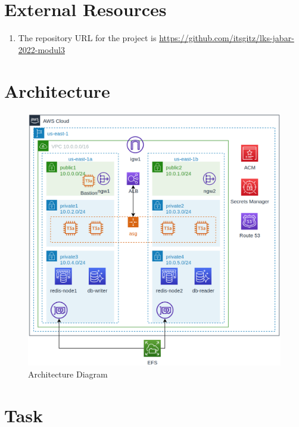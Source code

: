 \documentclass{article}
\begin{document}
\section{External Resources}\label{resources}
\begin{enumerate}
    \item The repository URL for the project is \href{https://github.com/itsgitz/lks-jabar-2022-modul3}{https://github.com/itsgitz/lks-jabar-2022-modul3}
\end{enumerate}

\newpage

\section{Architecture}
\begin{figure}[h]
\centering
\includegraphics[width=\textwidth]{modul3_architecture.png}
\caption{\label{fig:architecture}Architecture Diagram}
\end{figure}

\section{Task}
\end{document}
